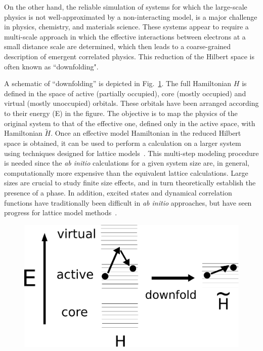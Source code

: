 \documentclass[aps, prb]{revtex4-1}
\begin{document}
On the other hand, the reliable simulation of systems for which the large-scale physics is not well-approximated by a non-interacting model, is a major challenge in physics, chemistry, and materials science. These systems appear to require a multi-scale approach in which the effective interactions between electrons at a small distance scale are determined, which then leads to a coarse-grained description of emergent correlated physics. This reduction of the Hilbert space is often known as ``downfolding".

A schematic of ``downfolding'' is depicted in Fig.~\ref{fig:effham}. The full Hamiltonian $H$ is defined in the space of active (partially occupied), core (mostly occupied) and virtual (mostly unoccupied) orbitals. These orbitals have been arranged according to their energy (E) in the figure. 
The objective is to map the physics of the original system to that of the effective one, defined only in the active space, with Hamiltonian $\tilde{H}$. Once an effective model Hamiltonian in the reduced Hilbert space  is obtained,  it can be used to perform a calculation on a larger system using techniques designed for 
lattice models~\cite{White1992,tps_nishino,Vidal_MERA,TPS_review,Changlani_CPS,
Neuscamman_CPS,mezzacapo,Marti,DMET_2012,Chen_DMET,Sandvik_loops,Blankenbecler,Alavi_FCIQMC,SQMC}. This multi-step modeling procedure is needed since the {\it ab initio} 
calculations for a given system size are, in general, 
computationally more expensive than the equivalent lattice calculations. 
Large sizes are crucial to study finite size effects, and in turn 
theoretically establish the presence of a phase. 
In addition, excited states and dynamical correlation functions have traditionally 
been difficult in {\it ab initio} approaches, 
but have seen progress for lattice model methods~\cite{Jeckelmann2002, Daley_tDMRG, White_tDMRG}.
\begin{figure}[htpb]
\centering
\includegraphics[width=0.4\linewidth]{./downfolding_scheme.pdf}
\caption{}
\label{fig:effham} 
\end{figure}
\end{document}
